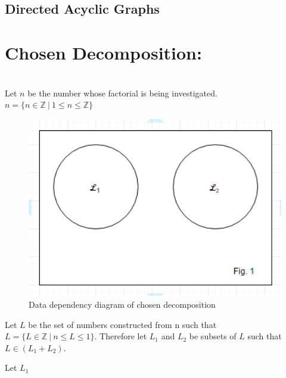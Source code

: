 \documentclass[11pt]{article}
\begin{document}
\begin{page}

\clearpage
\setcounter{page}{1}

\section{Directed Acyclic Graphs}
\noindent \chapter{Chosen Decomposition:} \\
\noindent Let $n$ be the number whose factorial is being investigated. \\
$ n = \{ n \in \mathbb{Z}\ |\ 1 \leq n \leq \mathbb{Z}\} $ 
\\

\begin{figure}[ht]
\centering
     \includegraphics[width=1.0\textwidth]{parallel_fig1}\\
     Data dependency diagram of chosen decomposition
\end{figure}
\noindent Let $L$ be the set of numbers constructed from n such that $L = \{ L \in \mathbb{Z}\ |\ n \leq L \leq 1\}$.
Therefore let $L_1$ and $L_2$ be subsets of $L$ such that $L \in (L_1 + L_2) $.

\noindent Let $L_1$


\end{page}
\end{document}
